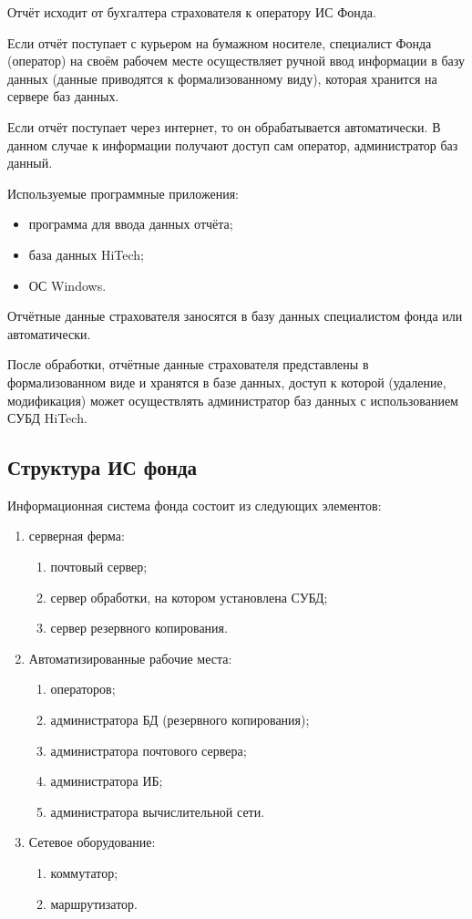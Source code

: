 Отчёт исходит от бухгалтера страхователя к оператору ИС Фонда.

\point Если отчёт поступает с курьером на бумажном носителе,
специалист Фонда (оператор) на своём рабочем месте осуществляет ручной
ввод информации в базу данных (данные приводятся к формализованному
виду), которая хранится на сервере баз данных.

Если отчёт поступает через интернет, то он обрабатывается
автоматически. В данном случае к информации получают доступ сам
оператор, администратор баз данный.

\point Используемые программные приложения:

\begin{itemize}
\item программа для ввода данных отчёта;
\item база данных HiTech;
\item ОС Windows.
\end{itemize}

\point Отчётные данные страхователя заносятся в базу данных
специалистом фонда или автоматически.

\point После обработки, отчётные данные страхователя представлены в
формализованном виде и хранятся в базе данных, доступ к которой
(удаление, модификация) может осуществлять администратор баз данных с
использованием СУБД HiTech.

\subsection{Структура ИС фонда}

Информационная система фонда состоит из следующих элементов:

\begin{enumerate}
\item серверная ферма:
  \begin{enumerate}
  \item почтовый сервер;
  \item сервер обработки, на котором установлена СУБД;
  \item сервер резервного копирования.
  \end{enumerate}
\item Автоматизированные рабочие места:
  \begin{enumerate}
  \item операторов;
  \item администратора БД (резервного копирования);
  \item администратора почтового сервера;
  \item администратора ИБ;
  \item администратора вычислительной сети.
  \end{enumerate}
\item Сетевое оборудование:
  \begin{enumerate}
  \item коммутатор;
  \item маршрутизатор.
  \end{enumerate}
\end{enumerate}


